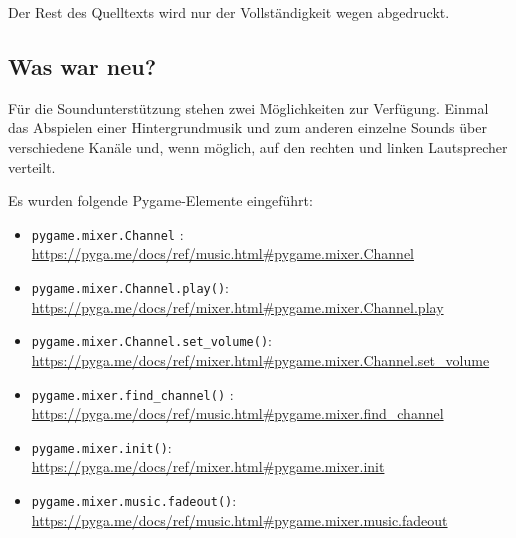 Der Rest des Quelltexts wird nur der Vollständigkeit wegen abgedruckt.



\subsection*{Was war neu?}

Für die Soundunterstützung stehen zwei Möglichkeiten zur Verfügung. Einmal das Abspielen einer Hintergrundmusik und zum anderen einzelne Sounds über verschiedene Kanäle und, wenn möglich, auf den rechten und linken Lautsprecher verteilt.

Es wurden folgende Pygame-Elemente eingeführt:
\begin{itemize}
	\item\texttt{pygame.mixer.Channel} :
\\ \url{https://pyga.me/docs/ref/music.html#pygame.mixer.Channel}

	\item \texttt{pygame.mixer.Channel.play()}:
\\ \url{https://pyga.me/docs/ref/mixer.html#pygame.mixer.Channel.play}

	\item \texttt{pygame.mixer.Channel.set\_volume()}:
\\ \url{https://pyga.me/docs/ref/mixer.html#pygame.mixer.Channel.set_volume}

	\item\texttt{pygame.mixer.find\_channel()} :
\\ \url{https://pyga.me/docs/ref/music.html#pygame.mixer.find_channel}

	\item \texttt{pygame.mixer.init()}:
\\ \url{https://pyga.me/docs/ref/mixer.html#pygame.mixer.init}

	\item\texttt{pygame.mixer.music.fadeout()}:
\\ \url{https://pyga.me/docs/ref/music.html#pygame.mixer.music.fadeout}


\end{itemize}
